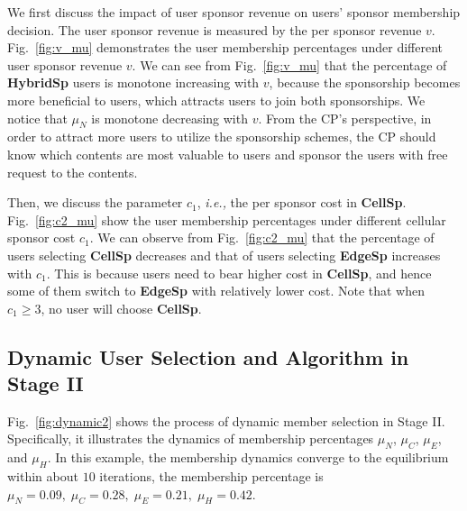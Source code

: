 

	
We first discuss the impact of user sponsor revenue on users' sponsor membership decision. The user sponsor revenue is measured by the per sponsor revenue $v$. Fig.~\ref{fig:v_mu} demonstrates the user membership percentages under different user sponsor revenue $v$. We can see from Fig.~\ref{fig:v_mu} that the percentage of \textbf{HybridSp} users is monotone increasing with $v$, because the sponsorship becomes more beneficial to users, which attracts users to join both sponsorships. We notice that $\mu_N$ is monotone decreasing with $v$. From the CP's perspective, in order to attract more users to utilize the sponsorship schemes, the CP should know which contents are most valuable to users and sponsor the users with free request to the contents.


Then, we discuss the parameter $c_1$, \emph{i.e.,} the per sponsor cost in \textbf{CellSp}. Fig.~\ref{fig:c2_mu} show the user membership percentages under different cellular sponsor cost $c_1$. We can observe from Fig.~\ref{fig:c2_mu} that the percentage of users selecting \textbf{CellSp} decreases and that of users selecting \textbf{EdgeSp} increases with $c_1$. This is because users need to bear higher cost in \textbf{CellSp}, and hence some of them switch to \textbf{EdgeSp} with relatively lower cost. Note that when $c_1\ge 3$, no user will choose \textbf{CellSp}.



\subsection{Dynamic User Selection and Algorithm in Stage II}

Fig.~\ref{fig:dynamic2} shows the process of dynamic member selection in Stage II. Specifically, it illustrates the dynamics of membership percentages $\mu_N$, $\mu_C$, $\mu_E$, and $\mu_H$. In this example, the membership dynamics converge to the equilibrium within about $10$ iterations, the membership percentage is $\mu_N=0.09,\; \mu_C=0.28, \;\mu_E=0.21, \;\mu_H=0.42$.

